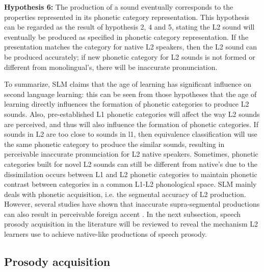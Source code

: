 \textbf{Hypothesis 6:} The production of a sound eventually corresponds to the properties represented in its phonetic category representation. This hypothesis can be regarded as the result of hypothesis 2, 4 and 5, stating the L2 sound will eventually be produced as specified in phonetic category representation. If the presentation matches the category for native L2 speakers, then the L2 sound can be produced accurately; if new phonetic category for L2 sounds is not formed or different from monolingual's, there will be inaccurate pronunciation.

To summarize, SLM claims that the age of learning has significant influence on second language learning: this can be seen from those hypotheses that the age of learning directly influences the formation of phonetic categories to produce L2 sounds. Also, pre-established L1 phonetic categories will affect the way L2 sounds are perceived, and thus will also influence the formation of phonetic categories. If sounds in L2 are too close to sounds in l1, then equivalence classification will use the same phonetic category to produce the similar sounds, resulting in perceivable inaccurate pronunciation for L2 native speakers. Sometimes, phonetic categories built for novel L2 sounds can still be different from native's due to the dissimilation occurs between L1 and L2 phonetic categories to maintain phonetic contrast between categories in a common L1-L2 phonological space. SLM mainly deals with phonetic acquisition, i.e. the segmental accuracy of L2 production. However, several studies have shown that inaccurate supra-segmental productions can also result in perceivable foreign accent \citep{rognoni2013testing,winters2013perceived}. In the next subsection, speech prosody acquisition in the literature will be reviewed to reveal the mechanism L2 learners use to achieve native-like productions of speech prosody.



\subsection{Prosody acquisition}

